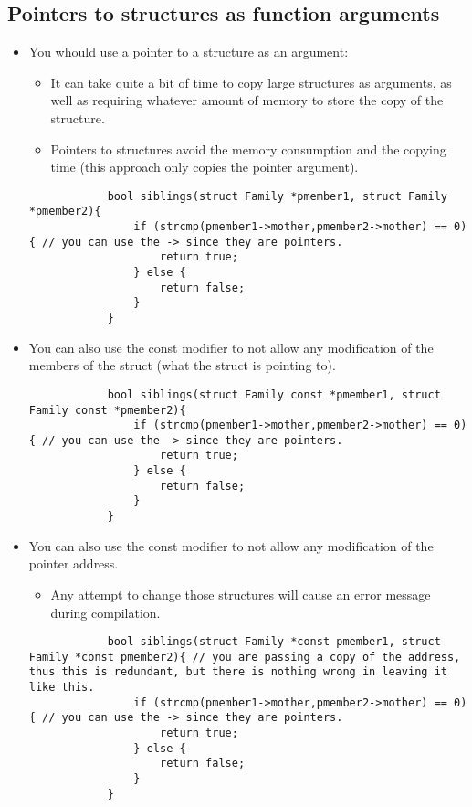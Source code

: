 \subsection{Pointers to structures as function arguments}
\begin{itemize}
    \item You whould use a pointer to a structure as an argument:
        \begin{itemize}
            \item It can take quite a bit of time to copy large structures as arguments, as well as requiring whatever amount of memory to store the copy of the structure. 
            \item Pointers to structures avoid the memory consumption and the copying time (this approach only copies the pointer argument).
        \end{itemize}
        \begin{verbatim}
            bool siblings(struct Family *pmember1, struct Family *pmember2){
                if (strcmp(pmember1->mother,pmember2->mother) == 0){ // you can use the -> since they are pointers.
                    return true;
                } else {
                    return false;
                }
            }
        \end{verbatim}
    
    \item You can also use the const modifier to not allow any modification of the members of the struct (what the struct is pointing to).
        \begin{verbatim}
            bool siblings(struct Family const *pmember1, struct Family const *pmember2){
                if (strcmp(pmember1->mother,pmember2->mother) == 0){ // you can use the -> since they are pointers.
                    return true;
                } else {
                    return false;
                }
            }
        \end{verbatim}
    
    \item You can also use the const modifier to not allow any modification of the pointer address.
        \begin{itemize}
            \item Any attempt to change those structures will cause an error message during compilation.
        \end{itemize}
        \begin{verbatim}
            bool siblings(struct Family *const pmember1, struct Family *const pmember2){ // you are passing a copy of the address, thus this is redundant, but there is nothing wrong in leaving it like this. 
                if (strcmp(pmember1->mother,pmember2->mother) == 0){ // you can use the -> since they are pointers.
                    return true;
                } else {
                    return false;
                }
            }
        \end{verbatim}
    

\end{itemize}

